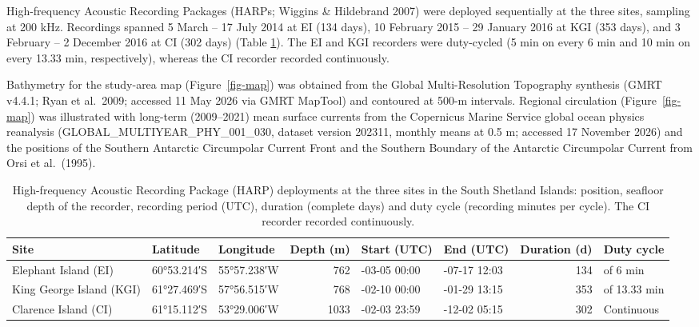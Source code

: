 \documentclass[
  11pt,
]{article}
\begin{document}
High-frequency Acoustic Recording Packages (HARPs; Wiggins \& Hildebrand
2007) were deployed sequentially at the three sites, sampling at 200
kHz. Recordings spanned 5 March -- 17 July 2014 at EI (134 days), 10
February 2015 -- 29 January 2016 at KGI (353 days), and 3 February -- 2
December 2016 at CI (302 days) (Table \ref{tab:deploy}). The EI and KGI
recorders were duty-cycled (5 min on every 6 min and 10 min on every
13.33 min, respectively), whereas the CI recorder recorded continuously.

Bathymetry for the study-area map (Figure~\ref{fig-map}) was obtained
from the Global Multi-Resolution Topography synthesis (GMRT v4.4.1; Ryan
et al.~2009; accessed 11 May 2026 via GMRT MapTool) and contoured at
500-m intervals. Regional circulation (Figure~\ref{fig-map}) was
illustrated with long-term (2009--2021) mean surface currents from the
Copernicus Marine Service global ocean physics reanalysis
(GLOBAL\_MULTIYEAR\_PHY\_001\_030, dataset version 202311, monthly means
at 0.5 m; accessed 17 November 2026) and the positions of the Southern
Antarctic Circumpolar Current Front and the Southern Boundary of the
Antarctic Circumpolar Current from Orsi et al.~(1995).

\begin{table}[!h]
\centering
\caption{\label{tab:deploy}High-frequency Acoustic Recording Package (HARP) deployments at the three sites in the South Shetland Islands: position, seafloor depth of the recorder, recording period (UTC), duration (complete days) and duty cycle (recording minutes per cycle). The CI recorder recorded continuously.}
\centering
\fontsize{8}{10}\selectfont
\begin{tabular}[t]{>{\raggedright\arraybackslash}p{2.6cm}llr>{\raggedright\arraybackslash}p{1.9cm}>{\raggedright\arraybackslash}p{1.9cm}r>{\raggedright\arraybackslash}p{1.6cm}}
\toprule
Site & Latitude & Longitude & Depth (m) & Start (UTC) & End (UTC) & Duration (d) & Duty cycle\\
\midrule
Elephant Island (EI) & 60°53.214′S & 55°57.238′W & 762 & 2014-03-05 00:00 & 2014-07-17 12:03 & 134 & 5 of 6 min\\
King George Island (KGI) & 61°27.469′S & 57°56.515′W & 768 & 2015-02-10 00:00 & 2016-01-29 13:15 & 353 & 10 of 13.33 min\\
Clarence Island (CI) & 61°15.112′S & 53°29.006′W & 1033 & 2016-02-03 23:59 & 2016-12-02 05:15 & 302 & Continuous\\
\bottomrule
\end{tabular}
\end{table}
\end{document}

